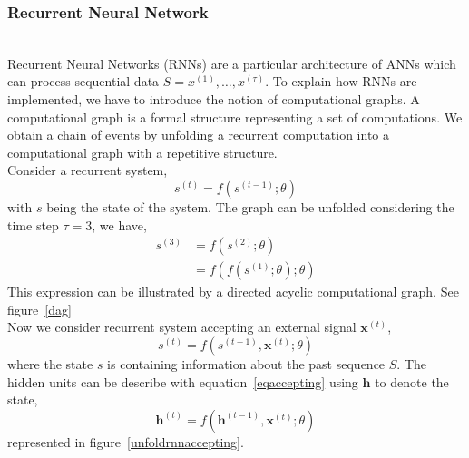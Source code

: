 
\subsubsection{Recurrent Neural Network}~\\


Recurrent Neural Networks (RNNs) are a particular architecture of ANNs which can
process sequential data $S = x^{(1)},\dots,x^{(\tau)}$. To explain how RNNs are
implemented, we have to introduce the notion of computational graphs.
A computational graph is a formal structure representing a set of computations.
We obtain a chain of events by unfolding a recurrent computation into a
computational graph with a repetitive structure. \\

Consider a recurrent system,
\begin{equation}
  s^{(t)} = f(s^{(t-1)};\theta)
\end{equation}
with $s$ being the state of the system. The graph can be unfolded considering
the time step $\tau = 3$, we have,
\begin{equation}
  \begin{split}
    s^{(3)} & = f(s^{(2)};\theta) \\
          & = f(f(s^{(1)};\theta);\theta)
  \end{split}
  \label{recurrentsystem}
\end{equation}
This expression can be illustrated by a directed acyclic computational graph.
See figure~\ref{dag}\\


Now we consider recurrent system accepting an external signal $\bm{x}^{(t)}$,
\begin{equation}
  s^{(t)} = f(s^{(t-1)},\bm{x}^{(t)};\theta)
  \label{eqaccepting}
\end{equation}
where the state $s$ is containing information about the past sequence $S$. The
hidden units can be describe with equation~\ref{eqaccepting} using $\bm{h}$ to
denote the state,
\begin{equation}
  \bm{h}^{(t)} = f(\bm{h}^{(t-1)},\bm{x}^{(t)};\theta)
\end{equation}
represented in figure~\ref{unfoldrnnaccepting}.\\


